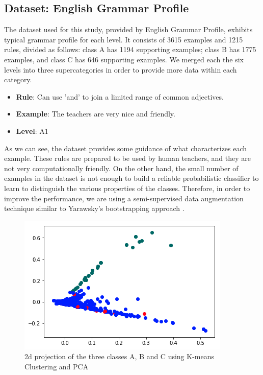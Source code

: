 \subsection{Dataset: English Grammar Profile}
The dataset used for this study, provided by English Grammar Profile, exhibits typical grammar profile for each level. It consists of 3615 examples and 1215 rules, divided as follows: class A has 1194 supporting examples; class B has 1775 examples, and class C has 646 supporting examples. We merged each the six levels into three supercategories in order to provide more data within each category. 

\begin{itemize}
    \item \textbf{Rule}: Can use 'and' to join a limited range of common adjectives.
    \item \textbf{Example}: The teachers are very nice and friendly.
    \item \textbf{Level}: A1
\end{itemize}
As we can see, the dataset provides some guidance of what characterizes each example. These rules are prepared to be used by human teachers, and they are not very computationally friendly. On the other hand, the small number of examples in the dataset is not enough to build a reliable probabilistic classifier to learn to distinguish the various properties of the classes. Therefore, in order to improve the performance, we are using a semi-supervised data augmentation technique similar to Yarawsky's bootstrapping approach \citep{yarowsky_unsupervised_1995}. 

\begin{figure}[t]
    \centering
    \includegraphics[width=.75\linewidth]{../Figures/pca_proj.png} 
    \caption{2d projection of the three classes A, B and C using K-means Clustering and PCA}
    \label{fig:cmdstudy}
\end{figure}


